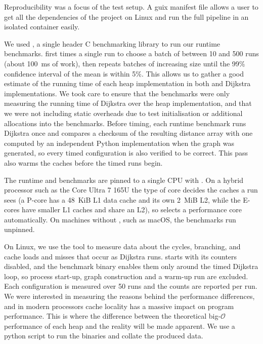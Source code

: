 Reproducibility was a focus of the test setup. A guix manifest file allows a
user to get all the dependencies of the project on Linux and run the full
pipeline in an isolated container easily.

We used , a single header C benchmarking library to run our runtime
benchmarks.  first times a single run to choose a batch of
between 10 and 500 runs (about 100~ms of work), then repeats batches of
increasing size until the 99\% confidence interval of the mean is within 5\%.
This allows us to gather a good estimate of
the running time of each heap implementation in both  and 
Dijkstra implementations. We took care to ensure that the benchmarks were only
measuring the running time of Dijkstra over the heap implementation, and that
we were not including static overheads due to test initialisation or additional
allocations into the benchmarks. Before timing, each runtime benchmark runs
Dijkstra once and compares a checksum of the resulting distance array with one
computed by an independent Python implementation when the graph was generated,
so every timed configuration is also verified to be correct. This pass also
warms the caches before the timed runs begin.

The runtime and  benchmarks are pinned to a single CPU with
. On a hybrid processor such as the Core Ultra 7 165U the type of
core decides the caches a run sees (a P-core has a 48~KiB L1 data cache and its
own 2~MiB L2, while the E-cores have smaller L1 caches and share an L2), so
 selects a performance core automatically. On
machines without , such as macOS, the benchmarks run unpinned.

On Linux, we use the  tool to measure data about the cycles, branching,
and cache loads and misses that occur as Dijkstra runs.  starts with
its counters disabled, and the benchmark binary enables them only around the
timed Dijkstra loop, so process start-up, graph construction and a warm-up run
are excluded. Each configuration is measured over 50 runs and the counts are
reported per run. We were interested in measuring
the reasons behind the performance differences, and in modern processors cache
locality has a massive impact on program performance. This is where the
difference between the theoretical big-$\mathcal{O}$ performance of each heap and the
reality will be made apparent. We use a python script to run the binaries and
collate the produced data.

